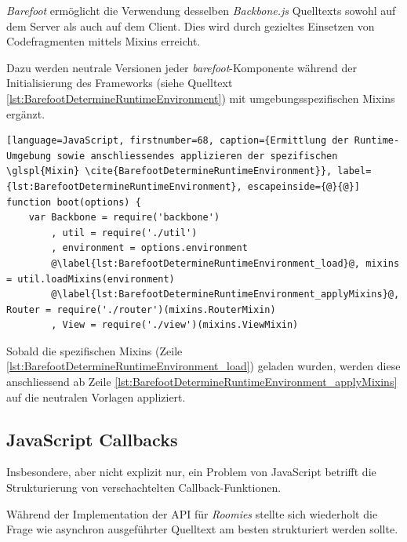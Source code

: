 \emph{Barefoot} \cite{Barefoot} ermöglicht die Verwendung desselben \emph{Backbone.js} Quelltexts sowohl auf dem Server als auch auf dem Client. Dies wird durch gezieltes Einsetzen von Codefragmenten mittels \gls{Mixin}s erreicht.

Dazu werden neutrale Versionen jeder \emph{barefoot}-Komponente während der Initialisierung des Frameworks (siehe Quelltext \ref{lst:BarefootDetermineRuntimeEnvironment}) mit umgebungsspezifischen Mixins ergänzt.

\begin{lstlisting}[language=JavaScript, firstnumber=68, caption={Ermittlung der Runtime-Umgebung sowie anschliessendes applizieren der spezifischen \glspl{Mixin} \cite{BarefootDetermineRuntimeEnvironment}}, label={lst:BarefootDetermineRuntimeEnvironment}, escapeinside={@}{@}]
function boot(options) {
	var Backbone = require('backbone')
		, util = require('./util')
		, environment = options.environment
		@\label{lst:BarefootDetermineRuntimeEnvironment_load}@, mixins = util.loadMixins(environment)
		@\label{lst:BarefootDetermineRuntimeEnvironment_applyMixins}@, Router = require('./router')(mixins.RouterMixin)
		, View = require('./view')(mixins.ViewMixin)
\end{lstlisting}

Sobald die spezifischen \gls{Mixin}s (Zeile \ref{lst:BarefootDetermineRuntimeEnvironment_load}) geladen wurden, werden diese anschliessend ab Zeile \ref{lst:BarefootDetermineRuntimeEnvironment_applyMixins} auf die neutralen Vorlagen appliziert.



\subsection{JavaScript Callbacks}
Insbesondere, aber nicht explizit nur, ein Problem von JavaScript betrifft die Strukturierung von verschachtelten Callback-Funktionen.

Während der Implementation der API für \emph{Roomies} stellte sich wiederholt die Frage wie asynchron ausgeführter Quelltext am besten strukturiert werden sollte.

